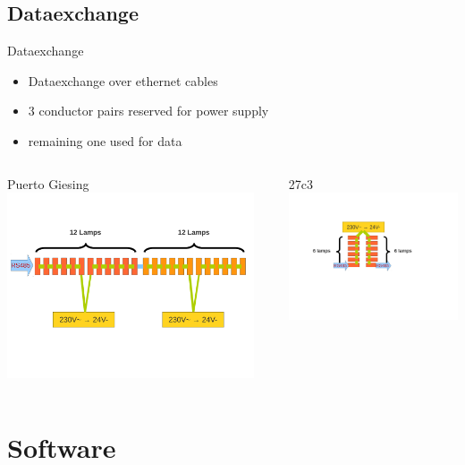 \documentclass{beamer}
\begin{document}
\subsection{Dataexchange}
  \begin{frame}{Dataexchange}
    \begin{itemize}
      \item Dataexchange over ethernet cables 
      \item 3 conductor pairs reserved for power supply 
      \item remaining one used for data
    \end{itemize}
    \begin{columns}[T]
      \begin{column}{7cm}
        \hskip 2.6cm
        Puerto Giesing
        \vskip 0.2cm
        \includegraphics[width=7.3cm, clip, trim= 0cm 4.6cm 0.5cm 4cm]{bilder/12lampen_rs485.pdf}
      \end{column}
      \begin{column}{5cm}
        \hskip 2.0cm
        27c3
        \vskip 0.7cm
         \includegraphics[width=5.5cm, clip, trim= 2.5cm 8cm 3.5cm 4cm]{bilder/6lampen_rs485.pdf}
      \end{column}
    \end{columns}
  \end{frame}
\section{Software}
\end{document}
